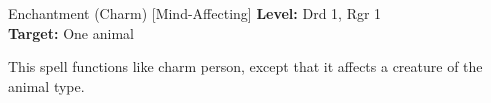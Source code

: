 {Enchantment (Charm) [Mind-Affecting]}
{
	\textbf{Level:}
	Drd 1, Rgr 1\\
	\textbf{Target:}
	One animal\\
}
{
	This spell functions like charm person, except that it affects a creature of the animal type.

}
